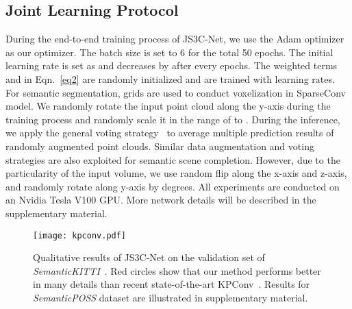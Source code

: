\documentclass[letterpaper]{article} \usepackage{aaai21}  \usepackage{times}  \usepackage{helvet} \usepackage{courier}  \usepackage[hyphens]{url}  \usepackage{graphicx} \urlstyle{rm} \def\UrlFont{\rm}  \usepackage{natbib}  \usepackage{booktabs}
\begin{document}
	\subsection{Joint Learning Protocol} 
	During the end-to-end training process of JS3C-Net, we use the Adam optimizer as our optimizer. 
The batch size is set to 6 for the total 50 epochs. 
The initial learning rate is set as  and decreases by  after every  epochs. 
The weighted terms  and  in Eqn.~\ref{eq2} are randomly initialized and are trained with  learning rates. 
	For semantic segmentation,  grids are used to conduct voxelization in SparseConv model. 
We randomly rotate the input point cloud along the y-axis during the training process and randomly scale it in the range of  to . 
During the inference, we apply the general voting strategy~\cite{Thomas_2019_ICCV,hu2019randla} to average multiple prediction results of randomly augmented point clouds.
Similar data augmentation and voting strategies are also exploited for semantic scene completion. However, due to the particularity of the input volume, we use random flip along the x-axis and z-axis, and randomly rotate along y-axis by  degrees. 
All experiments are conducted on an Nvidia Tesla V100 GPU. 
    More network details will be described in the supplementary material.

	\begin{figure*}[t]
		
		\noindent\texttt{[image: kpconv.pdf]}
		
		\caption{Qualitative results of JS3C-Net on the validation set of \textit{SemanticKITTI}~\cite{behley2019semantickitti}. {\color{red} Red} circles show that our method performs better in many details than recent state-of-the-art KPConv~\cite{Thomas_2019_ICCV}. Results for \textit{SemanticPOSS} dataset are illustrated in supplementary material.}
		\label{fig:fig4}
		
	\end{figure*}
	
\end{document}
